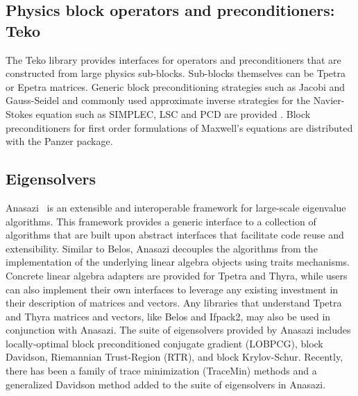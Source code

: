 \subsection{Physics block operators and preconditioners: Teko}
\label{sec:teko}

The Teko library provides interfaces for operators and preconditioners that are constructed from large physics sub-blocks.
Sub-blocks themselves can be Tpetra or Epetra matrices.
Generic block preconditioning strategies such as Jacobi and Gauss-Seidel and commonly used approximate inverse strategies for the Navier-Stokes equation such as SIMPLEC, LSC and PCD are provided \cite{CyrShadidEtAl2012_StabilizationScalableBlockPreconditioning}.
Block preconditioners for first order formulations of Maxwell's equations are distributed with the Panzer package.




\subsection{Eigensolvers}
Anasazi~\cite{Baker2009a} is an extensible and interoperable framework for large-scale eigenvalue algorithms.
This framework provides a generic interface to a collection of algorithms that are built upon abstract interfaces
that facilitate code reuse and extensibility.  Similar to Belos, Anasazi decouples the algorithms from the 
implementation of the underlying linear algebra objects using traits mechanisms.  Concrete linear algebra adapters
are provided for Tpetra and Thyra, while users can also implement their own interfaces to leverage any existing
investment in their description of matrices and vectors.  Any libraries that understand Tpetra and Thyra matrices
and vectors, like Belos and Ifpack2, may also be used in conjunction with Anasazi.  The suite of eigensolvers provided
by Anasazi includes locally-optimal block preconditioned conjugate gradient (LOBPCG), block Davidson, Riemannian Trust-Region
(RTR), and block Krylov-Schur.  Recently, there has been a family of trace minimization (TraceMin) methods and a
generalized Davidson method added to the suite of eigensolvers in Anasazi. 

